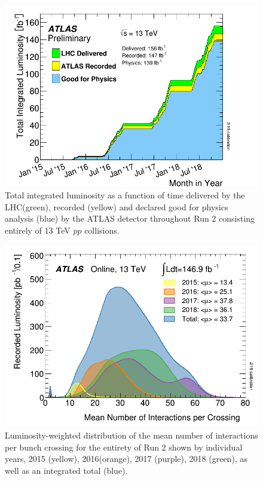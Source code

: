 \begin{figure}[h!]
	\centering
	\includegraphics[width=.5\columnwidth]{../ThesisImages/LHCImages/ATLASLumi.png}
	\caption{Total integrated luminosity as a function of time delivered by the LHC(green), recorded (yellow) and declared good for physics analysis (blue) by the ATLAS detector throughout Run 2 consisting entirely of 13 TeV $pp$ collisions.
	}
	\label{fig:ATLASLumi}
\end{figure}

\begin{figure}[h!]
	\centering
	\includegraphics[width=.5\columnwidth]{../ThesisImages/LHCImages/meanIntperCrossing.png}
	\caption{Luminosity-weighted distribution of the mean number of interactions per bunch crossing for the entirety of Run 2 shown by individual years, 2015 (yellow), 2016(orange), 2017 (purple), 2018 (green), as well as an integrated total (blue).
	}
	\label{fig:ATLASmeanIntperCrossingi}
\end{figure}

